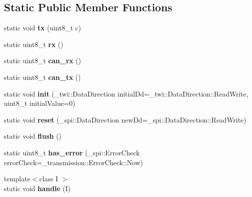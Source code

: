 \subsection*{Static Public Member Functions}
\begin{DoxyCompactItemize}
\item 
\hypertarget{classTwiMaster_af776b246fea206cfbc1a9119ca3781ee}{}\label{classTwiMaster_af776b246fea206cfbc1a9119ca3781ee} 
static void {\bfseries tx} (uint8\+\_\+t c)
\item 
\hypertarget{classTwiMaster_a8f36cf2b7036472f1a0122d0d9821998}{}\label{classTwiMaster_a8f36cf2b7036472f1a0122d0d9821998} 
static uint8\+\_\+t {\bfseries rx} ()
\item 
\hypertarget{classTwiMaster_aad636e5ed8565f8fa8021b296a1b42e0}{}\label{classTwiMaster_aad636e5ed8565f8fa8021b296a1b42e0} 
static uint8\+\_\+t {\bfseries can\+\_\+rx} ()
\item 
\hypertarget{classTwiMaster_a4f1b0dc15dbe2cc2806409c81fba3f1d}{}\label{classTwiMaster_a4f1b0dc15dbe2cc2806409c81fba3f1d} 
static uint8\+\_\+t {\bfseries can\+\_\+tx} ()
\item 
\hypertarget{classTwiMaster_ac1bf8233b8e041d2ff4524915de30902}{}\label{classTwiMaster_ac1bf8233b8e041d2ff4524915de30902} 
static void {\bfseries init} (\+\_\+twi\+::\+Data\+Direction initial\+Dd=\+\_\+twi\+::\+Data\+Direction\+::\+Read\+Write, uint8\+\_\+t initial\+Value=0)
\item 
\hypertarget{classTwiMaster_a13f0e087f9959af68c0c3bc51cd477ab}{}\label{classTwiMaster_a13f0e087f9959af68c0c3bc51cd477ab} 
static void {\bfseries reset} (\+\_\+spi\+::\+Data\+Direction new\+Dd=\+\_\+spi\+::\+Data\+Direction\+::\+Read\+Write)
\item 
\hypertarget{classTwiMaster_a820c9e3f978761f3fcfc6c47ec23b873}{}\label{classTwiMaster_a820c9e3f978761f3fcfc6c47ec23b873} 
static void {\bfseries flush} ()
\item 
\hypertarget{classTwiMaster_ab0b45aca23e9cca74eab03699b13c6c5}{}\label{classTwiMaster_ab0b45aca23e9cca74eab03699b13c6c5} 
static uint8\+\_\+t {\bfseries has\+\_\+error} (\+\_\+spi\+::\+Error\+Check error\+Check=\+\_\+transmission\+::\+Error\+Check\+::\+Now)
\item 
\hypertarget{classTwiMaster_a237d5394a8d9a15edfabd29ea9e3e17f}{}\label{classTwiMaster_a237d5394a8d9a15edfabd29ea9e3e17f} 
{\footnotesize template$<$class I $>$ }\\static void {\bfseries handle} (I)
\item 
\hypertarget{classTwiMaster_a608be7ffc6b33c6b11da50f9f665f650}{}\label{classTwiMaster_a608be7ffc6b33c6b11da50f9f665f650} 

\end{DoxyCompactItemize}
